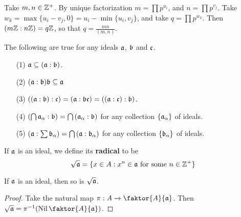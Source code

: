 \begin{example}\label{example_5.20}
  Take $m,n \in \Z^+$. By unique factorization $m=\prod{p^{u_i}}$, and
  $n=\prod{p^{v_j}}$. Take $w_k=\max{\{u_i-v_j,0\}}=u_i-\min{\{u_i,v_j\}}$, and
  take $q=\prod{p^{w_k}}$. Then $(m\Z:n\Z)=q\Z$, so that $q=\frac{mn}{(m,n)}$.
\end{example}

\begin{lemma}\label{lemma_5.5.13}
  The following are true for any ideals $\af$,  $\bf$ and  $\cf$.
  \begin{enumerate}
    \item[(1)] $\af \subseteq (\af:\bf)$.

    \item[(2)] $(\af:\bf)\bf \subseteq \af$

    \item[(3)] $((\af:\bf):\cf)=(\af:\bf\cf)=((\af:\cf):\bf)$.

    \item[(4)] $(\bigcap{\af_\a}:\bf)=\bigcap{(\af_\a:\bf)}$ for any collection
      $\{\af_\a\}$ of ideals.

    \item[(5)] $(\af:\sum{\bf_\a})=\bigcap{(\af:\bf_\a)}$ for any collection
      $\{\bf_\a\}$ of ideals.
  \end{enumerate}
\end{lemma}

\begin{definition}
  If $\af$ is an ideal, we define its \textbf{radical} to be
  \begin{equation*}
    \sqrt{\af}=\{x \in A : x^n \in \af \text{ for some } n \in \Z^+\}
  \end{equation*}
\end{definition}

\begin{lemma}\label{lemma_5.5.14}
  If $\af$ is an ideal, then so is $\sqrt{\af}$.
\end{lemma}
\begin{proof}
  Take the natural map $\pi:A \xrightarrow{} \faktor{A}{\af}$. Then
  $\sqrt{\af}=\inv{\pi}(\Nil{\faktor{A}{\af}})$.
\end{proof}


